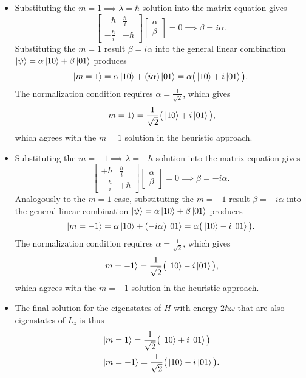 \documentclass[11pt, a4paper]{article}
\begin{document}
\begin{itemize}
	\item Substituting the $ m = 1 \implies \lambda = \hbar $ solution into the matrix equation gives
	\begin{equation*}
		\begin{bmatrix}
			-\hbar & \frac{\hbar}{i}\\
			-\frac{\hbar}{i} & -\hbar
		\end{bmatrix}
		\begin{bmatrix}
			\alpha\\
			\beta
		\end{bmatrix}
		= 0 \implies \beta = i \alpha.
	\end{equation*}
	Substituting the $ m = 1 $ result $ \beta = i \alpha $ into the general linear combination $ \ket{\psi} = \alpha \ket{10} + \beta \ket{01} $ produces
	\begin{equation*}
		\ket{m=1} = \alpha \ket{10} + (i\alpha)\ket{01} = \alpha \big(\ket{10} + i \ket{01}\big).
	\end{equation*}
	The normalization condition requires $ \alpha = \frac{1}{\sqrt{2}} $, which gives
	\begin{equation*}
		\ket{m=1} = \frac{1}{\sqrt{2}}\big(\ket{10} + i \ket{01}\big),
	\end{equation*}
	which agrees with the $ m = 1 $ solution in the heuristic approach.
	
	\item Substituting the $ m = - 1 \implies \lambda = -\hbar $ solution into the matrix equation gives
	\begin{equation*}
		\begin{bmatrix}
			+\hbar & \frac{\hbar}{i}\\
			-\frac{\hbar}{i} & +\hbar
		\end{bmatrix}
		\begin{bmatrix}
			\alpha\\
			\beta
		\end{bmatrix}
		= 0 \implies \beta = - i \alpha.
	\end{equation*}
	Analogously to the $ m = 1 $ case, substituting the $ m = -1 $ result $ \beta = -i \alpha $ into the general linear combination $ \ket{\psi} = \alpha \ket{10} + \beta \ket{01} $ produces
	\begin{equation*}
		\ket{m=-1} = \alpha \ket{10} + (-i\alpha)\ket{01} = \alpha \big(\ket{10} - i \ket{01}\big).
	\end{equation*}
	The normalization condition requires $ \alpha = \frac{1}{\sqrt{2}} $, which gives
	\begin{equation*}
		\ket{m=-1} = \frac{1}{\sqrt{2}}\big(\ket{10} - i \ket{01}\big),
	\end{equation*}
	which agrees with the $ m = - 1 $ solution in the heuristic approach.
	
	\item The final solution for the eigenstates of $ H $ with energy $ 2\hbar \omega $ that are also eigenstates of $ L_{z} $ is thus
	\begin{align*}
		&\ket{m=1} = \frac{1}{\sqrt{2}}\big(\ket{10} + i \ket{01}\big)\\
		&\ket{m=-1} = \frac{1}{\sqrt{2}}\big(\ket{10} - i \ket{01}\big).
	\end{align*}
\end{itemize}
\end{document}
